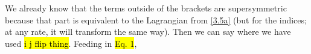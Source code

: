 \documentclass[11pt]{article}
\begin{document}
{	We already know that the terms outside of the brackets are supersymmetric because that part is equivalent to the Lagrangian from \ref{3.5a} (but for the indices; at any rate, it will transform the same way).  Then we can say
	where we have used \hl{i j flip thing}.  Feeding in \hl{Eq. 1},
	}
\end{document}
